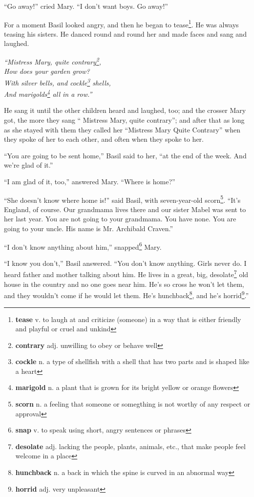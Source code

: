 ``Go away!'' cried Mary. ``I don't want boys. Go away!''

For a moment Basil looked angry, and then he began to tease\footnote{\textbf{tease} v. to laugh at and criticize (someone) in a way that is either friendly and playful or cruel and unkind}. He was always teasing his sisters. He danced round and round her and made faces and sang and laughed.

\begin{center}
\textit{
``Mistress Mary, quite contrary\footnote{\textbf{contrary} adj. unwilling to obey or behave well},\\
How does your garden grow?\\
With silver bells, and cockle\footnote{\textbf{cockle} n. a type of shellfish with a shell that has two parts and is shaped like a heart } shells,\\
And marigolds\footnote{\textbf{marigold} n. a plant that is grown for its bright yellow or orange flowers} all in a row.''
}
\end{center}

He sang it until the other children heard and laughed, too; and the crosser Mary got, the more they sang `` Mistress Mary, quite contrary''; and after that as long as she stayed with them they called her ``Mistress Mary Quite Contrary'' when they spoke of her to each other, and often when they spoke to her.

``You are going to be sent home,'' Basil said to her, ``at the end of the week. And we're glad of it.''

``I am glad of it, too,'' answered Mary. ``Where is home?''

``She doesn't know where home is!'' said Basil, with seven-year-old scorn\footnote{\textbf{scorn} n. a feeling that someone or somegthing is not worthy of any respect or approval}. ``It's England, of course. Our grandmama lives there and our sister Mabel was sent to her last year. You are not going to your grandmama. You have none. You are going to your uncle. His name is Mr. Archibald Craven.''

``I don't know anything about him,'' snapped\footnote{\textbf{snap} v. to speak using short, angry sentences or phrases} Mary.

``I know you don't,'' Basil answered. ``You don't know anything. Girls never do. I heard father and mother talking about him. He lives in a great, big, desolate\footnote{\textbf{desolate} adj. lacking the people, plants, animals, etc., that make people feel welcome in a place} old house in the country and no one goes near him. He's so cross he won't let them, and they wouldn't come if he would let them. He's hunchback\footnote{\textbf{hunchback} n. a back in which the spine is curved in an abnormal way}, and he's horrid\footnote{\textbf{horrid} adj. very unpleasant}.''

